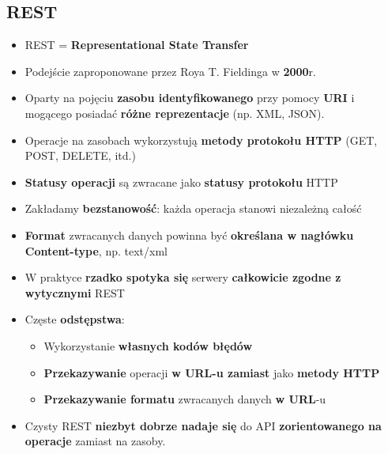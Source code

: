 \documentclass[../main.tex]{subfiles}
\begin{document}
    \subsection{REST}
    \begin{itemize}
        \item REST = \textbf{Representational State Transfer}
        \item Podejście zaproponowane przez Roya T. Fieldinga w \textbf{2000}r.
        \item Oparty na pojęciu \textbf{zasobu identyfikowanego} przy pomocy \textbf{URI} i mogącego posiadać \textbf{różne reprezentacje} (np. XML, JSON).
        \item Operacje na zasobach wykorzystują \textbf{metody protokołu HTTP} (GET, POST, DELETE, itd.)
        \item \textbf{Statusy operacji} są zwracane jako \textbf{statusy protokołu} HTTP
        \item Zakładamy \textbf{bezstanowość}: każda operacja stanowi niezależną całość
        \item \textbf{Format} zwracanych danych powinna być \textbf{określana w nagłówku Content-type}, np. text/xml
        \item W praktyce \textbf{rzadko spotyka się} serwery \textbf{całkowicie zgodne z wytycznymi} REST
        \item Częste \textbf{odstępstwa}:
        \begin{itemize}
            \item Wykorzystanie \textbf{własnych kodów błędów}
            \item \textbf{Przekazywanie} operacji \textbf{w URL-u zamiast} jako \textbf{metody HTTP}
            \item \textbf{Przekazywanie formatu} zwracanych danych \textbf{w URL}-u
        \end{itemize}
        \item Czysty REST \textbf{niezbyt dobrze nadaje się} do API \textbf{zorientowanego na operacje} zamiast na zasoby.
    \end{itemize}
\end{document}
